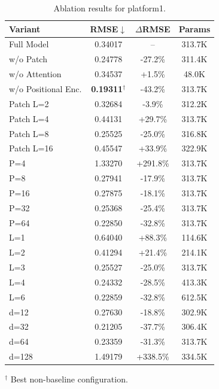 \begin{table}[t]
\centering
\caption{Ablation results for platform1.}
\label{tab:ablation_platform1}
\scriptsize
\setlength{\tabcolsep}{3pt}
\begin{tabular}{lccc}
\toprule
Variant & RMSE$\downarrow$ & $\Delta$RMSE & Params \\
\midrule
Full Model & 0.34017 & -- & 313.7K \\
\addlinespace[1pt]
w/o Patch & 0.24778 & -27.2\% & 311.4K \\
w/o Attention & 0.34537 & +1.5\% & 48.0K \\
w/o Positional Enc. & \textbf{0.19311}$^\dagger$ & -43.2\% & 313.7K \\
\addlinespace[1pt]
Patch L=2 & 0.32684 & -3.9\% & 312.2K \\
Patch L=4 & 0.44131 & +29.7\% & 313.7K \\
Patch L=8 & 0.25525 & -25.0\% & 316.8K \\
Patch L=16 & 0.45547 & +33.9\% & 322.9K \\
\addlinespace[1pt]
P=4 & 1.33270 & +291.8\% & 313.7K \\
P=8 & 0.27941 & -17.9\% & 313.7K \\
P=16 & 0.27875 & -18.1\% & 313.7K \\
P=32 & 0.25368 & -25.4\% & 313.7K \\
P=64 & 0.22850 & -32.8\% & 313.7K \\
\addlinespace[1pt]
L=1 & 0.64040 & +88.3\% & 114.6K \\
L=2 & 0.41294 & +21.4\% & 214.1K \\
L=3 & 0.25527 & -25.0\% & 313.7K \\
L=4 & 0.24332 & -28.5\% & 413.3K \\
L=6 & 0.22859 & -32.8\% & 612.5K \\
\addlinespace[1pt]
d=12 & 0.27630 & -18.8\% & 302.9K \\
d=32 & 0.21205 & -37.7\% & 306.4K \\
d=64 & 0.23359 & -31.3\% & 313.7K \\
d=128 & 1.49179 & +338.5\% & 334.5K \\
\bottomrule
\end{tabular}
\vspace{2pt}
\raggedright\footnotesize $^\dagger$ Best non-baseline configuration.
\end{table}
